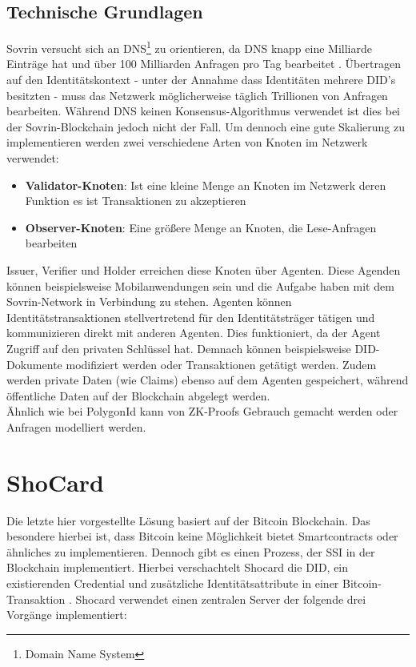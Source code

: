 \subsection{Technische Grundlagen}
Sovrin versucht sich an DNS\footnote{Domain Name System} zu orientieren, da DNS knapp eine Milliarde Einträge hat und über 100 Milliarden Anfragen pro Tag bearbeitet \cite{ID42}. Übertragen auf den Identitätskontext - unter der Annahme dass Identitäten mehrere DID's besitzten - muss das Netzwerk möglicherweise täglich Trillionen von Anfragen bearbeiten.
Während DNS keinen Konsensus-Algorithmus verwendet ist dies bei der Sovrin-Blockchain jedoch nicht der Fall. Um dennoch eine gute Skalierung zu implementieren werden zwei verschiedene Arten von Knoten im Netzwerk verwendet:
\begin{itemize}
	\item \textbf{Validator-Knoten}: Ist eine kleine Menge an Knoten im Netzwerk deren Funktion es ist Transaktionen zu akzeptieren
	\item \textbf{Observer-Knoten}: Eine größere Menge an Knoten, die Lese-Anfragen bearbeiten
\end{itemize}
Issuer, Verifier und Holder erreichen diese Knoten über Agenten. Diese Agenden können beispielsweise Mobilanwendungen sein und die Aufgabe haben mit dem Sovrin-Network in Verbindung zu stehen. Agenten können Identitätstransaktionen stellvertretend für den Identitätsträger tätigen und kommunizieren direkt mit anderen Agenten. Dies funktioniert, da der Agent Zugriff auf den privaten Schlüssel hat. Demnach können beispielsweise DID-Dokumente modifiziert werden oder Transaktionen getätigt werden.
Zudem werden private Daten (wie Claims) ebenso auf dem Agenten gespeichert, während öffentliche Daten auf der Blockchain abgelegt werden. \\
Ähnlich wie bei PolygonId kann von ZK-Proofs Gebrauch gemacht werden oder Anfragen modelliert werden.

\section{ShoCard}
Die letzte hier vorgestellte Lösung basiert auf der Bitcoin Blockchain. Das besondere hierbei ist, dass Bitcoin keine Möglichkeit bietet Smartcontracts oder ähnliches zu implementieren. Dennoch gibt es einen Prozess, der SSI in der Blockchain implementiert. Hierbei verschachtelt Shocard die DID, ein existierenden Credential und zusätzliche Identitätsattribute in einer Bitcoin-Transaktion \cite{ID46}. Shocard verwendet einen zentralen Server der folgende drei Vorgänge implementiert:

